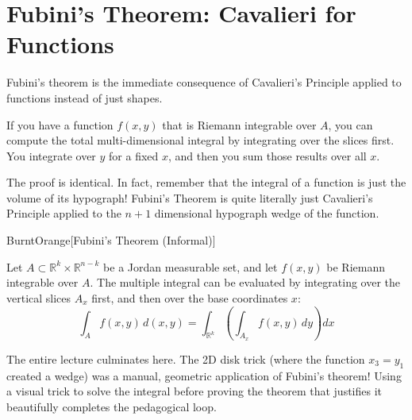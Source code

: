 \section{Fubini's Theorem: Cavalieri for Functions}

\begin{spoken-clean}
Fubini's theorem is the immediate consequence of Cavalieri's Principle applied to functions instead of just shapes. 

If you have a function $f(x,y)$ that is Riemann integrable over $A$, you can compute the total multi-dimensional integral by integrating over the slices first. You integrate over $y$ for a fixed $x$, and then you sum those results over all $x$. 

The proof is identical. In fact, remember that the integral of a function is just the volume of its hypograph! Fubini's Theorem is quite literally just Cavalieri's Principle applied to the $n+1$ dimensional hypograph wedge of the function.
\end{spoken-clean}

\begin{color-box}{BurntOrange}[Fubini's Theorem (Informal)]
\begin{theorem}
Let $A \subset \mathbb{R}^k \times \mathbb{R}^{n-k}$ be a Jordan measurable set, and let $f(x,y)$ be Riemann integrable over $A$. The multiple integral can be evaluated by integrating over the vertical slices $A_x$ first, and then over the base coordinates $x$:
\[
\int_A f(x,y) \, d(x,y) = \int_{\mathbb{R}^k} \left( \int_{A_x} f(x,y) \, dy \right) dx
\]
\end{theorem}
\end{color-box}

\begin{didactic-insight}
The entire lecture culminates here. The 2D disk trick (where the function $x_3 = y_1$ created a wedge) was a manual, geometric application of Fubini's theorem! Using a visual trick to solve the integral before proving the theorem that justifies it beautifully completes the pedagogical loop.
\end{didactic-insight}
